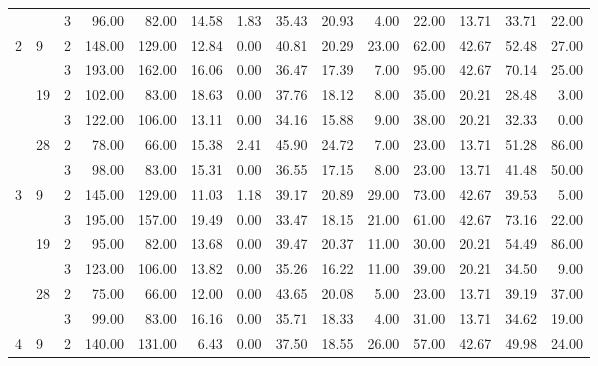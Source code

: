 \begin{tabular}{lllrrrrrrrrrrr}
  &    & 3 &    96.00 &     82.00 & 14.58 &    1.83 &   35.43 &   20.93 &    4.00 &   22.00 &   13.71 &  33.71 &    22.00 \\
\cline{1-14}
\cline{2-14}
\multirow{6}{*}{2} & \multirow{2}{*}{9} & 2 &   148.00 &    129.00 & 12.84 &    0.00 &   40.81 &   20.29 &   23.00 &   62.00 &   42.67 &  52.48 &    27.00 \\
  &    & 3 &   193.00 &    162.00 & 16.06 &    0.00 &   36.47 &   17.39 &    7.00 &   95.00 &   42.67 &  70.14 &    25.00 \\
\cline{2-14}
  & \multirow{2}{*}{19} & 2 &   102.00 &     83.00 & 18.63 &    0.00 &   37.76 &   18.12 &    8.00 &   35.00 &   20.21 &  28.48 &     3.00 \\
  &    & 3 &   122.00 &    106.00 & 13.11 &    0.00 &   34.16 &   15.88 &    9.00 &   38.00 &   20.21 &  32.33 &     0.00 \\
\cline{2-14}
  & \multirow{2}{*}{28} & 2 &    78.00 &     66.00 & 15.38 &    2.41 &   45.90 &   24.72 &    7.00 &   23.00 &   13.71 &  51.28 &    86.00 \\
  &    & 3 &    98.00 &     83.00 & 15.31 &    0.00 &   36.55 &   17.15 &    8.00 &   23.00 &   13.71 &  41.48 &    50.00 \\
\cline{1-14}
\cline{2-14}
\multirow{6}{*}{3} & \multirow{2}{*}{9} & 2 &   145.00 &    129.00 & 11.03 &    1.18 &   39.17 &   20.89 &   29.00 &   73.00 &   42.67 &  39.53 &     5.00 \\
  &    & 3 &   195.00 &    157.00 & 19.49 &    0.00 &   33.47 &   18.15 &   21.00 &   61.00 &   42.67 &  73.16 &    22.00 \\
\cline{2-14}
  & \multirow{2}{*}{19} & 2 &    95.00 &     82.00 & 13.68 &    0.00 &   39.47 &   20.37 &   11.00 &   30.00 &   20.21 &  54.49 &    86.00 \\
  &    & 3 &   123.00 &    106.00 & 13.82 &    0.00 &   35.26 &   16.22 &   11.00 &   39.00 &   20.21 &  34.50 &     9.00 \\
\cline{2-14}
  & \multirow{2}{*}{28} & 2 &    75.00 &     66.00 & 12.00 &    0.00 &   43.65 &   20.08 &    5.00 &   23.00 &   13.71 &  39.19 &    37.00 \\
  &    & 3 &    99.00 &     83.00 & 16.16 &    0.00 &   35.71 &   18.33 &    4.00 &   31.00 &   13.71 &  34.62 &    19.00 \\
\cline{1-14}
\cline{2-14}
\multirow{6}{*}{4} & \multirow{2}{*}{9} & 2 &   140.00 &    131.00 &  6.43 &    0.00 &   37.50 &   18.55 &   26.00 &   57.00 &   42.67 &  49.98 &    24.00 \\

\end{tabular}
